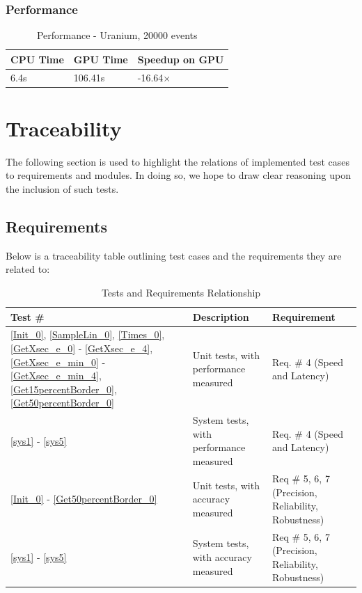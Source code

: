 \documentclass[12pt]{article}
\begin{document}
	\subsubsection{Performance}
		\begin{table}[H]
		\centering
		\caption{Performance - Uranium, 20000 events}\label{sys5Perf}
		\begin{tabular}{lll}
		\toprule
		\bf CPU Time& \bf GPU Time& \bf Speedup on GPU\\\midrule
		6.4s&106.41s&-16.64$\times$\\\bottomrule
		\end{tabular}
		\end{table}		

\section{Traceability}\label{Traceability}
The following section is used to highlight the relations of implemented test cases to requirements and modules. In doing so, we hope to draw clear reasoning upon the inclusion of such tests. 

\subsection{Requirements}
Below is a traceability table outlining test cases and the requirements they are related to:\\

\begin{center}
\begin{longtable}{>{\raggedright\arraybackslash}p{}>{\raggedright\arraybackslash}p{}>{\raggedright\arraybackslash}p{}}
\caption{Tests and Requirements Relationship}\label{Table_TestsAndRequirements}
\\\toprule
\bf Test \#  & \bf Description & \bf Requirement\\\midrule
\ref{Init_0}, \ref{SampleLin_0}, \ref{Times_0}, \ref{GetXsec_e_0} - \ref{GetXsec_e_4}, \ref{GetXsec_e_min_0} - \ref{GetXsec_e_min_4}, \ref{Get15percentBorder_0}, \ref{Get50percentBorder_0} & Unit tests, with performance measured & Req. \# 4 (Speed and Latency)\\
\ref{sys1} - \ref{sys5} & System tests, with performance measured & Req. \# 4 (Speed and Latency)\\
\ref{Init_0} - \ref{Get50percentBorder_0} & Unit tests, with accuracy measured & Req \# 5, 6, 7 (Precision, Reliability, Robustness)\\
\ref{sys1} - \ref{sys5} & System tests, with accuracy measured & Req \# 5, 6, 7 (Precision, Reliability, Robustness)\\
\bottomrule
\end{longtable}
\end{center}
\end{document}
